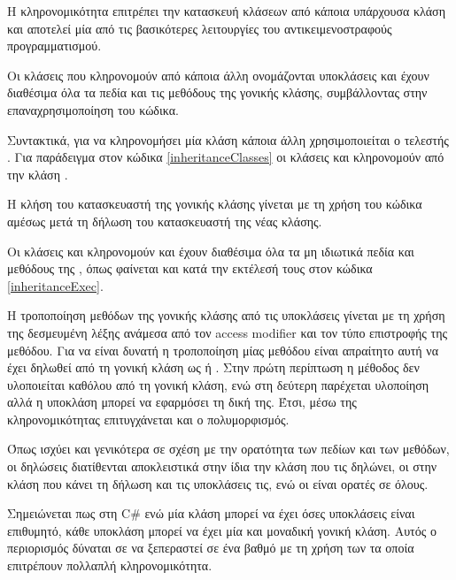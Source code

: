 Η κληρονομικότητα επιτρέπει την κατασκευή κλάσεων από κάποια υπάρχουσα κλάση και αποτελεί μία από τις βασικότερες λειτουργίες του αντικειμενοστραφούς προγραμματισμού.

Οι κλάσεις που κληρονομούν από κάποια άλλη ονομάζονται υποκλάσεις και έχουν διαθέσιμα όλα τα πεδία και τις μεθόδους της γονικής κλάσης, συμβάλλοντας στην επαναχρησιμοποίηση του κώδικα.

Συντακτικά, για να κληρονομήσει μία κλάση κάποια άλλη χρησιμοποιείται ο τελεστής \codebox{:}. Για παράδειγμα στον κώδικα \ref{inheritanceClasses} οι κλάσεις  και  κληρονομούν από την κλάση .

Η κλήση του κατασκευαστή της γονικής κλάσης γίνεται με τη χρήση του κώδικα  αμέσως μετά τη δήλωση του κατασκευαστή της νέας κλάσης.

Οι κλάσεις  και  κληρονομούν και έχουν διαθέσιμα όλα τα μη ιδιωτικά πεδία και μεθόδους της , όπως φαίνεται και κατά την εκτέλεσή τους στον κώδικα \ref{inheritanceExec}.



Η τροποποίηση μεθόδων της γονικής κλάσης από τις υποκλάσεις γίνεται με τη χρήση της δεσμευμένη λέξης  ανάμεσα από τον access modifier και τον τύπο επιστροφής της μεθόδου. Για να είναι δυνατή η τροποποίηση μίας μεθόδου είναι απραίτητο αυτή να έχει δηλωθεί από τη γονική κλάση ως  ή . Στην πρώτη περίπτωση η μέθοδος δεν υλοποιείται καθόλου από τη γονική κλάση, ενώ στη δεύτερη παρέχεται υλοποίηση αλλά η υποκλάση μπορεί να εφαρμόσει τη δική της. Έτσι, μέσω της κληρονομικότητας επιτυγχάνεται και ο πολυμορφισμός.



Όπως ισχύει και γενικότερα σε σχέση με την ορατότητα των πεδίων και των μεθόδων, οι δηλώσεις  διατίθενται αποκλειστικά στην ίδια την κλάση που τις δηλώνει, οι  στην κλάση που κάνει τη δήλωση και τις υποκλάσεις τις, ενώ οι  είναι ορατές σε όλους.

Σημειώνεται πως στη C\# ενώ μία κλάση μπορεί να έχει όσες υποκλάσεις είναι επιθυμητό, κάθε υποκλάση μπορεί να έχει μία και μοναδική γονική κλάση. Αυτός ο περιορισμός δύναται σε να ξεπεραστεί σε ένα βαθμό με τη χρήση των  τα οποία επιτρέπουν πολλαπλή κληρονομικότητα.

